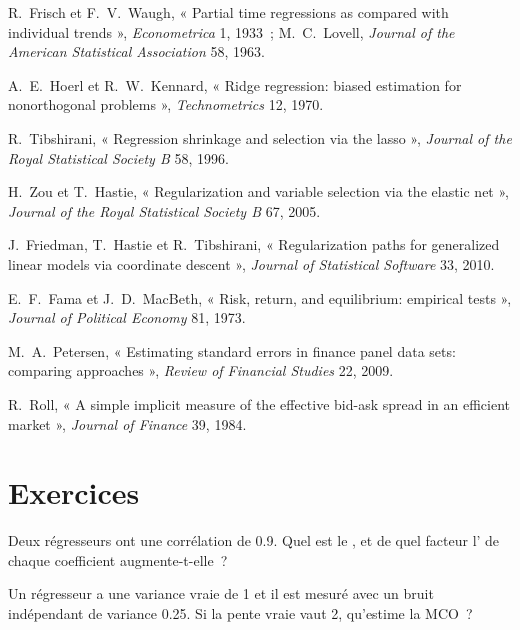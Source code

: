 \begin{omsources}
\item R.~Frisch et F.~V.~Waugh, « Partial time regressions as compared with individual trends », \emph{Econometrica} 1, 1933~; M.~C.~Lovell,
\emph{Journal of the American Statistical Association} 58, 1963.
\item A.~E.~Hoerl et R.~W.~Kennard, « Ridge regression: biased estimation for nonorthogonal problems », \emph{Technometrics} 12, 1970.
\item R.~Tibshirani, « Regression shrinkage and selection via the lasso », \emph{Journal of the Royal Statistical Society B} 58, 1996.
\item H.~Zou et T.~Hastie, « Regularization and variable selection via the elastic net », \emph{Journal of the Royal Statistical Society B}
67, 2005.
\item J.~Friedman, T.~Hastie et R.~Tibshirani, « Regularization paths for generalized linear models via coordinate descent », \emph{Journal of
Statistical Software} 33, 2010.
\item E.~F.~Fama et J.~D.~MacBeth, « Risk, return, and equilibrium: empirical tests », \emph{Journal of Political Economy} 81, 1973.
\item M.~A.~Petersen, « Estimating standard errors in finance panel data sets: comparing approaches », \emph{Review of Financial Studies} 22, 2009.
\item R.~Roll, « A simple implicit measure of the effective bid-ask spread in an efficient market », \emph{Journal of Finance} 39, 1984.
\end{omsources}

\section{Exercices}

\begin{exercise}[$\star$]\label{exo:qm:linear-models-under-stress:1}
Deux régresseurs ont une corrélation de 0.9. Quel est le , et de quel facteur l' de chaque coefficient augmente-t-elle~?
\end{exercise}

\begin{exercise}[$\star$]\label{exo:qm:linear-models-under-stress:2}
Un régresseur a une variance vraie de 1 et il est mesuré avec un bruit indépendant de variance 0.25. Si la pente vraie vaut 2, qu'estime la MCO~?
\end{exercise}


